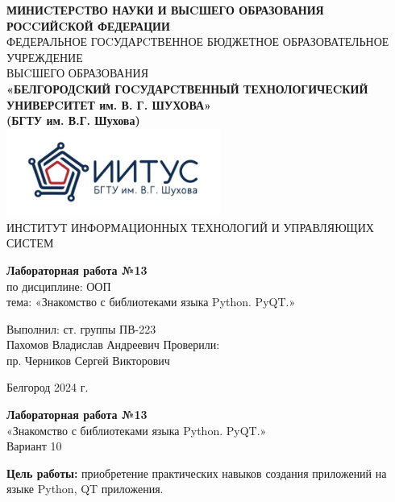 \documentclass[a4paper,14pt]{extarticle}
\newcommand\textbox[1]{
	\parbox{.45\textwidth}{#1}
}
\begin{document}
\begin{center}
    \small{
        \textbf{МИНИCТЕРCТВО НАУКИ И ВЫCШЕГО ОБРАЗОВАНИЯ РОCCИЙCКОЙ ФЕДЕРАЦИИ}\\
        ФЕДЕРАЛЬНОЕ ГОCУДАРCТВЕННОЕ БЮДЖЕТНОЕ ОБРАЗОВАТЕЛЬНОЕ УЧРЕЖДЕНИЕ\\ВЫCШЕГО ОБРАЗОВАНИЯ \\
        \textbf{«БЕЛГОРОДCКИЙ ГОCУДАРCТВЕННЫЙ ТЕХНОЛОГИЧЕCКИЙ\\УНИВЕРCИТЕТ им. В. Г. ШУХОВА»\\ (БГТУ им. В.Г. Шухова)} \\
        \bigbreak
        \includegraphics[width=70mm]{log}\\
        ИНСТИТУТ ИНФОРМАЦИОННЫХ ТЕХНОЛОГИЙ И УПРАВЛЯЮЩИХ СИСТЕМ\\}
\end{center}

\vfill
\begin{center}
    \large{
        \textbf{
            Лабораторная работа №13}}\\
    \normalsize{
        по дисциплине: ООП \\
        тема: «Знакомство с библиотеками языка Python. PyQT.»}
\end{center}
\vfill
\hfill\textbox{
    Выполнил: ст. группы ПВ-223\\Пахомов Владислав Андреевич
    \bigbreak
    Проверили: \\пр. Черников Сергей Викторович
}
\vfill\begin{center}
    Белгород 2024 г.
\end{center}
\newpage
\begin{center}
    \textbf{Лабораторная работа №13}\\
    «Знакомство с библиотеками языка Python. PyQT.»\\
    Вариант 10
\end{center}
\textbf{Цель работы: }приобретение практических навыков создания приложений на
языке Python, QT приложения.\\
\end{document}
